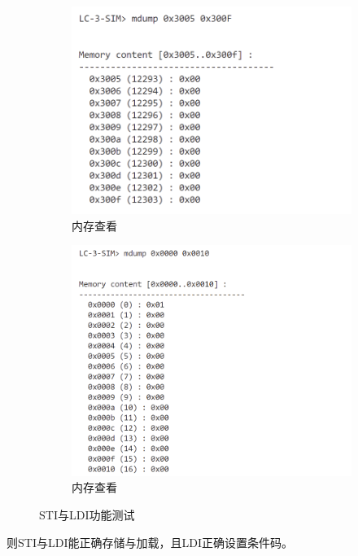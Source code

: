 \documentclass[UTF8]{ctexart}
\begin{document}
\begin{figure}[ht]
  \begin{subfigure}{0.45\textwidth}
    \includegraphics[width=\linewidth]{sti3.png}
    \caption{内存查看}
  \end{subfigure}
  \begin{subfigure}{0.44\textwidth}
    \includegraphics[width=\linewidth]{sti4.png}
    \caption{内存查看}
  \end{subfigure}
  \caption{STI与LDI功能测试}
  \label{stildi}
\end{figure}

则STI与LDI能正确存储与加载，且LDI正确设置条件码。
\end{document}
